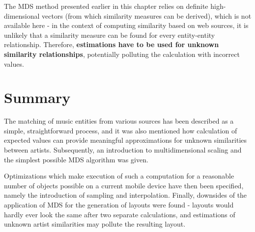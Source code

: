 The MDS method presented earlier in this chapter relies on definite high-dimensional vectors (from which similarity measures can be derived), which is not available here - in the context of computing similarity based on web sources, it is unlikely that a similarity measure can be found for every entity-entity relationship. Therefore, \textbf{estimations have to be used for unknown similarity relationships}, potentially polluting the calculation with incorrect values.

\section{Summary}

The matching of music entities from various sources has been described as a simple, straightforward process, and it was also mentioned how calculation of expected values can provide meaningful approximations for unknown similarities between artists. Subsequently, an introduction to multidimensional scaling and the simplest possible MDS algorithm was given. 

Optimizations which make execution of such a computation for a reasonable number of objects possible on a current mobile device have then been specified, namely the introduction of sampling and interpolation. Finally, downsides of the application of MDS for the generation of layouts were found - layouts would hardly ever look the same after two separate calculations, and estimations of unknown artist similarities may pollute the resulting layout.